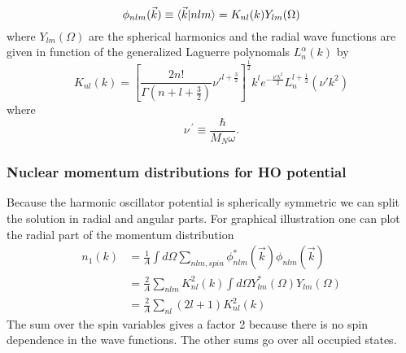 \documentclass[12pt]{article}
\begin{document}
\begin{equation}
\phi_{nlm}(\vec{k}) \equiv \braket{\vec{k}|nlm} = K_{nl}(k)Y_{lm}(\Omega)	
\end{equation}
where $Y_{lm}(\Omega)$ are the spherical harmonics and the radial wave functions are given in function of the generalized Laguerre polynomals $L^\alpha_n(k)$ by
\begin{equation}
 K_{nl}(k) = \left[ \frac{2n!}{\Gamma(n+l+\frac{3}{2})}\nu'^{l+\frac{3}{2}} \right]^{\frac{1}{2}} k^l e^{-\frac{\nu' k^2}{2}} L^{l+\frac{1}{2}}_n(\nu' k^2)
\end{equation}
where 
\begin{equation}
\nu^{\ \prime} \equiv \frac{\hbar}{M_N \omega}.
\end{equation}

\subsubsection{Nuclear momentum distributions for HO potential}
Because the harmonic oscillator potential is spherically symmetric we can split the solution in radial and angular parts. For graphical illustration one can plot the radial part of the momentum distribution
\begin{align}
n_1(k) &  =  \frac{1}{A} \int d\Omega \sum_{nlm, spin}\phi^*_{nlm}(\vec{k}) \phi_{nlm}(\vec{k}) \\
& =   \frac{2}{A} \sum_{nlm} K^2_{nl}(k) \int d\Omega Y^*_{lm}(\Omega)  Y_{lm}(\Omega) \\
& =  \frac{2}{A} \sum_{nl} (2l+1) K^2_{nl}(k) 
\end{align}
The sum over the spin variables gives a factor 2 because there is no spin dependence in the wave functions. The other sums go over all occupied states.
\end{document}
